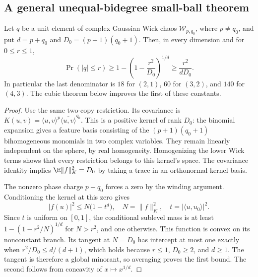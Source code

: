 \subsection{A general unequal-bidegree small-ball theorem}
\begin{theorem}\label{thm:sk-all-degrees}
Let $q$ be a unit element of complex Gaussian Wick chaos $\mathcal W_{p,q_0}$, where $p\ne q_0$, and put $d=p+q_0$ and $D_0=(p+1)(q_0+1)$. Then, in every dimension and for $0\le r\le1$,
\[
 \boxed{\Pr(|q|\le r)\ge1-\left(1-\frac{r^2}{D_0}\right)^{1/d}
 \ge\frac{r^2}{dD_0}.}
\]
In particular the last denominator is $18$ for $(2,1)$, $60$ for $(3,2)$, and $140$ for $(4,3)$. The cubic theorem below improves the first of these constants.
\end{theorem}
\begin{proof}
Use the same two-copy restriction. Its covariance is $K(u,v)=\langle u,v\rangle^p\overline{\langle u,v\rangle}^{q_0}$. This is a positive kernel of rank $D_0$: the binomial expansion gives a feature basis consisting of the $(p+1)(q_0+1)$ bihomogeneous monomials in two complex variables. They remain linearly independent on the sphere, by real homogeneity. Homogenizing the lower Wick terms shows that every restriction belongs to this kernel's space. The covariance identity implies $\E\|f\|_K^2=D_0$ by taking a trace in an orthonormal kernel basis.

The nonzero phase charge $p-q_0$ forces a zero by the winding argument. Conditioning the kernel at this zero gives
\[
 |f(u)|^2\le N\bigl(1-t^d\bigr),\quad N=\|f\|_K^2,
 \quad t=|\langle u,u_0\rangle|^2.
\]
Since $t$ is uniform on $[0,1]$, the conditional sublevel mass is at least $1-(1-r^2/N)^{1/d}$ for $N>r^2$, and one otherwise. This function is convex on its nonconstant branch. Its tangent at $N=D_0$ has intercept at most one exactly when $r^2/D_0\le d/(d+1)$, which holds because $r\le1$, $D_0\ge2$, and $d\ge1$. The tangent is therefore a global minorant, so averaging proves the first bound. The second follows from concavity of $x\mapsto x^{1/d}$.
\end{proof}

